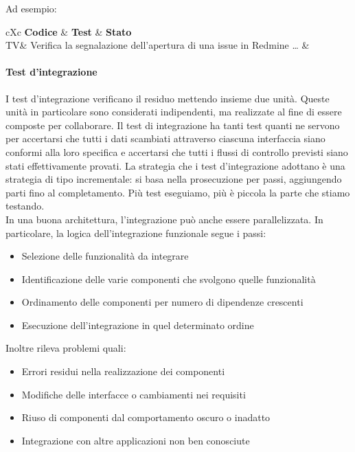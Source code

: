 			Ad esempio:

			\newenvironment{VTtable}[1][1]{%
				\renewcommand*{\arraystretch}{#1}%
				\renewcommand\theadfont{\bfseries}%
				\oldtabularx%
			}{\endoldtabularx}
			\newcommand{\addtotv}{\stepcounter{tv}TV\thetv}
			\begin{table}[H]
				\begin{VTtable}[1.7]{\textwidth}{cXc}
					\rowcolor{\tablegray}
					\textbf{Codice} & \centering\textbf{Test} & \textbf{Stato} \\\toprule
					\addtotv & Verifica la segnalazione dell'apertura di una issue in Redmine \dots
					& \TNI \\
					\bottomrule
				\end{VTtable}
			\end{table}

			\paragraph{Test d'integrazione} \label{testintegrazione}
			I test d'integrazione verificano il residuo mettendo insieme due unità. Queste unità in particolare sono considerati indipendenti, ma realizzate al fine di essere composte per collaborare.
			Il test di integrazione ha tanti test quanti ne servono per accertarsi che tutti i dati scambiati attraverso ciascuna interfaccia siano conformi alla loro specifica e accertarsi che tutti i flussi di controllo previsti siano stati effettivamente provati.
			La strategia che i test d'integrazione adottano è una strategia di tipo incrementale: si basa nella prosecuzione per passi, aggiungendo parti fino al completamento.
			Più test eseguiamo, più è piccola la parte che stiamo testando. \\
			In una buona architettura, l'integrazione può anche essere parallelizzata.
			In particolare, la logica dell'integrazione funzionale segue i passi:
			\begin{itemize}
				\item Selezione delle funzionalità da integrare
				\item Identificazione delle varie componenti che svolgono quelle funzionalità
				\item Ordinamento delle componenti per numero di dipendenze crescenti
				\item Esecuzione dell'integrazione in quel determinato ordine
			\end{itemize}
			Inoltre rileva problemi quali:
			\begin{itemize}
				\item Errori residui nella realizzazione dei componenti
				\item Modifiche delle interfacce o cambiamenti nei requisiti
				\item Riuso di componenti dal comportamento oscuro o inadatto
				\item Integrazione con altre applicazioni non ben conosciute
			\end{itemize}

